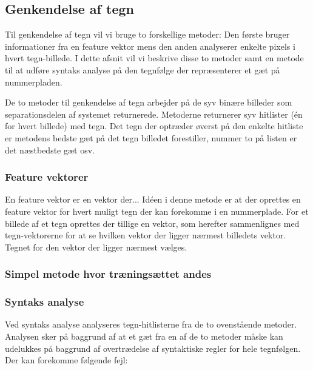 \subsection{Genkendelse af tegn}

\label{sec_monster}

Til genkendelse af tegn vil vi bruge to forskellige metoder: Den første bruger informationer fra en feature vektor mens den anden analyserer enkelte pixels i hvert tegn-billede. I dette afsnit vil vi beskrive disse to metoder samt en metode til at udføre syntaks analyse på den tegnfølge der repræsenterer et gæt på nummerpladen.

De to metoder til genkendelse af tegn arbejder på de syv binære billeder som separationsdelen af systemet returnerede. Metoderne returnerer syv hitlister (én for hvert billede) med tegn. Det tegn der optræder øverst på den enkelte hitliste er metodens bedste gæt på det tegn billedet forestiller, nummer to på listen er det næstbedste gæt osv.

\subsubsection{Feature vektorer}
En feature vektor er en vektor der... Idéen i denne metode er at der oprettes en feature vektor for hvert muligt tegn der kan forekomme i en nummerplade. For et billede af et tegn oprettes der tillige en vektor, som herefter sammenlignes med tegn-vektorerne for at se hvilken vektor der ligger nærmest billedets vektor. Tegnet for den vektor der ligger nærmest vælges.



\subsubsection{Simpel metode hvor træningsættet andes}

\subsubsection{Syntaks analyse}

Ved syntaks analyse analyseres tegn-hitlisterne fra de to ovenstående metoder. Analysen sker på baggrund af at et gæt fra en af de to metoder måske kan udelukkes på baggrund af overtrædelse af syntaktiske regler for hele tegnfølgen. Der kan forekomme følgende fejl:

